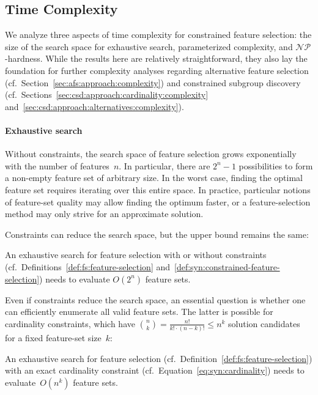 \subsection{Time Complexity}
\label{sec:syn:approach:complexity}

We analyze three aspects of time complexity for constrained feature selection:
the size of the search space for exhaustive search, parameterized complexity, and $\mathcal{NP}$-hardness.
While the results here are relatively straightforward, they also lay the foundation for further complexity analyses regarding alternative feature selection (cf.~Section~\ref{sec:afs:approach:complexity}) and constrained subgroup discovery (cf.~Sections~\ref{sec:csd:approach:cardinality:complexity} and~\ref{sec:csd:approach:alternatives:complexity}).

\paragraph{Exhaustive search}

Without constraints, the search space of feature selection grows exponentially with the number of features~$n$.
In particular, there are $2^n - 1$ possibilities to form a non-empty feature set of arbitrary size.
In the worst case, finding the optimal feature set requires iterating over this entire space.
In practice, particular notions of feature-set quality may allow finding the optimum faster, or a feature-selection method may only strive for an approximate solution.

Constraints can reduce the search space, but the upper bound remains the same:
%
\begin{proposition}
	An exhaustive search for feature selection with or without constraints (cf.~Definitions~\ref{def:fs:feature-selection} and~\ref{def:syn:constrained-feature-selection}) needs to evaluate $O(2^n)$ feature sets.
	\label{prop:syn:complexity-constrained-exhaustive}
\end{proposition}
%
Even if constraints reduce the search space, an essential question is whether one can efficiently enumerate all valid feature sets.
The latter is possible for cardinality constraints, which have $\binom{n}{k} = \frac{n!}{k! \cdot (n-k)!} \leq n^k$ solution candidates for a fixed feature-set size~$k$:
%
\begin{proposition}
	An exhaustive search for feature selection (cf.~Definition~\ref{def:fs:feature-selection}) with an exact cardinality constraint (cf.~Equation~\ref{eq:syn:cardinality}) needs to evaluate~$O(n^k)$ feature sets.
	\label{prop:syn:complexity-cardinality-exhaustive}
\end{proposition}

